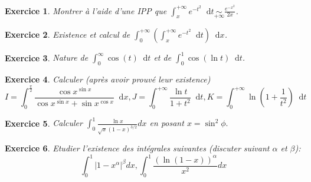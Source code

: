 \documentclass[12pt,a4paper]{article}
\newcommand{\R}{\mathbb{R}}
\newcommand{\N}{\mathbb{N}}
\newcommand{\diff}{\mathop{}\mathopen{}\mathrm{d}}%
{%
\theoremstyle{break}
\theoremprework{%
\rule{0.5\linewidth}{0.3pt}}
\theorempostwork{\hfill%
\rule{0.5\linewidth}{0.3pt}}
\theoremheaderfont{\scshape}
\theoremseparator{ ---}
\newtheorem{Prop}{%
\textcolor{blue}{Proposition}}[section]
}
\theoremstyle{break}
\newtheorem{Exo}{Exercice}
\begin{document}
\begin{Exo}
	Montrer à l'aide d'une IPP que $\int_x^{+\infty}e^{-t^2}\diff t\underset{+\infty}{\sim}\frac{e^{-x^2}}{2x}$.
\end{Exo}

\begin{Exo}
	Existence et calcul de $\displaystyle\int_0^{+\infty}\left(\int_x^{+\infty}e^{-t^2}\diff t\right)\diff x$.
\end{Exo}

\begin{Exo}
	Nature de $\int_0^{\infty}\cos\left(t\right)\diff t$ et de $\int_0^{1}\cos\left(\ln t\right)\diff t$.
\end{Exo}



 \begin{Exo}
	Calculer (après avoir prouvé leur existence) 
\begin{equation*}
I=\int_{0}^{\frac{\pi }{2}}\frac{\cos x^{\sin x}}{\cos x^{\sin x}+\sin x^{\cos	x}}\diff x,J=\int_{0}^{+\infty }\frac{\ln t}{1+t^{2}}\diff t,K=\int_{0}^{+\infty}\ln\left(1+\frac{1}{t^2}\right)\diff t
\end{equation*}

\end{Exo}


\newpage

 \begin{Exo}
	Calculer $\displaystyle\int_{0}^{1}\frac{\ln x}{\sqrt{x}\left( 1-x\right) ^{3/2}}dx$
en posant $x=\sin ^{2}\phi .$
\end{Exo}

\begin{Exo}
	 Etudier l'existence des int\'{e}grales suivantes (discuter suivant $%
\alpha $ et $\beta $)\thinspace : 
\begin{equation*}
\int_{0}^{1}\left\vert 1-x^{\alpha }\right\vert ^{\beta }dx,\int_{0}^{1}%
\frac{\left( \ln \left( 1-x\right) \right) ^{\alpha }}{x^{2}}dx
\end{equation*}
\end{Exo}
\end{document}
